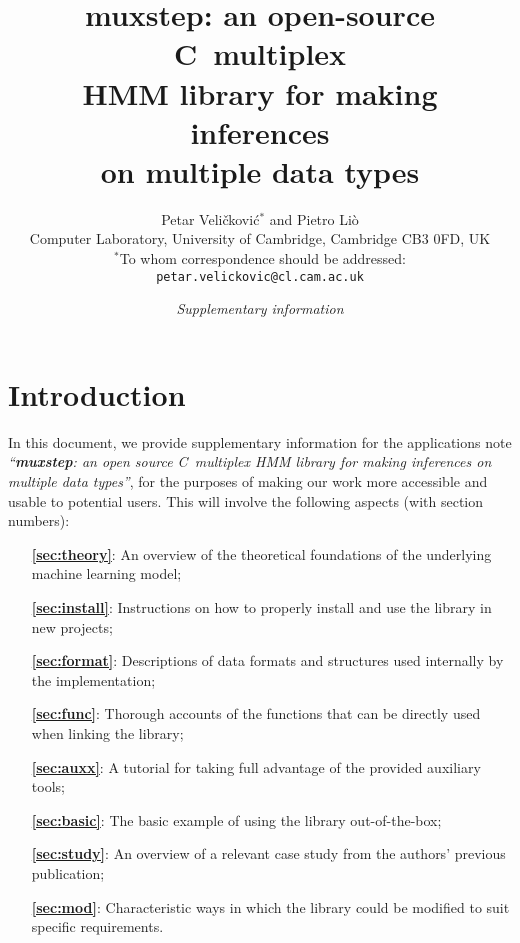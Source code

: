 \documentclass[12pt]{article}
\def\CC{{C\nolinebreak[4]\hspace{-.05em}\raisebox{.4ex}{\tiny\bf ++}}}
\def\CCC{{C\nolinebreak[4]\hspace{-.05em}\raisebox{.4ex}{\small\bf ++}}}
\begin{document}
	\title{\bf muxstep: an open-source \CCC\ multiplex\\ HMM library for making inferences \\on multiple data types}
	\author{Petar Veli\v{c}kovi\'{c}$^*$ and Pietro Li\`{o}\\{\small Computer Laboratory, University of Cambridge, Cambridge CB3 0FD, UK}\\{\footnotesize $^*$To whom correspondence should be addressed: {\tt petar.velickovic@cl.cam.ac.uk}}}
	\date{\it Supplementary information}
	\maketitle
\tableofcontents
	\section{Introduction}
	In this document, we provide supplementary information for the applications note \emph{``{\bf muxstep}: an open source \CC\ multiplex HMM library for making inferences on multiple data types''}, for the purposes of making our work more accessible and usable to potential users. This will involve the following aspects (with section numbers):
	\begin{itemize}
		\item[{\bf \cref{sec:theory}}:] An overview of the theoretical foundations of the underlying machine learning model;
		\item[{\bf \cref{sec:install}}:] Instructions on how to properly install and use the library in new projects;
		\item[{\bf \cref{sec:format}}:] Descriptions of data formats and structures used internally by the implementation;
		\item[{\bf \cref{sec:func}}:] Thorough accounts of the functions that can be directly used when linking the library;
		\item[{\bf \cref{sec:auxx}}:] A tutorial for taking full advantage of the provided auxiliary tools;
		\item[{\bf \cref{sec:basic}}:] The basic example of using the library out-of-the-box;
		\item[{\bf \cref{sec:study}}:] An overview of a relevant case study from the authors' previous publication;
		\item[{\bf \cref{sec:mod}}:] Characteristic ways in which the library could be modified to suit specific requirements.
	\end{itemize}
	
\end{document}
